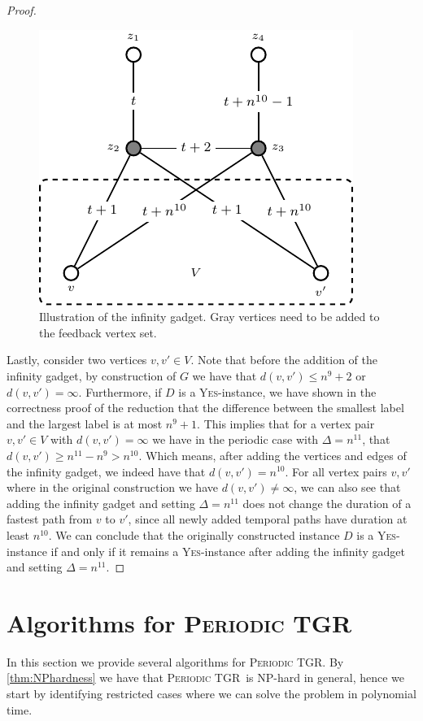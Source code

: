 \documentclass[a4paper,UKenglish,cleveref, autoref, thm-restate]{lipics-v2021}
\newcommand{\deltaExact}{\textsc{Periodic TGR}}
\begin{document}
\begin{proof}
\begin{figure}[t]
\includegraphics{fig-W1-infinity}
    \caption{Illustration of the infinity gadget. Gray vertices need to be added to the feedback vertex set.}\label{fig:hardness2}
\end{figure}

Lastly, consider two vertices $v,v'\in V$. Note that before the addition of the infinity gadget, by construction of $G$ we have that $d(v,v')\le n^9+2$ or $d(v,v')=\infty$. Furthermore, if $D$ is a \textsc{Yes}-instance, we have shown in the correctness proof of the reduction that the difference between the smallest label and the largest label is at most $n^9+1$. This implies that for a vertex pair $v,v'\in V$ with $d(v,v')=\infty$ we have in the periodic case with $\Delta=n^{11}$, that $d(v,v')\ge n^{11}-n^9>n^{10}$. Which means, after adding the vertices and edges of the infinity gadget, we indeed have that $d(v,v')=n^{10}$. For all vertex pairs $v,v'$ where in the original construction we have $d(v,v')\neq\infty$, we can also see that adding the infinity gadget and setting $\Delta=n^{11}$ does not change the duration of a fastest path from $v$ to $v'$, since all newly added temporal paths have duration at least $n^{10}$. We can conclude that the originally constructed instance $D$ is a \textsc{Yes}-instance if and only if it remains a \textsc{Yes}-instance after adding the infinity gadget and setting $\Delta=n^{11}$.
\end{proof}




\section{Algorithms for \deltaExact}\label{sec:algos}
In this section we provide several algorithms for \deltaExact. By \cref{thm:NPhardness} we have that \deltaExact\ is NP-hard in general, hence we start by identifying restricted cases where we can solve the problem in polynomial time.
\end{document}
